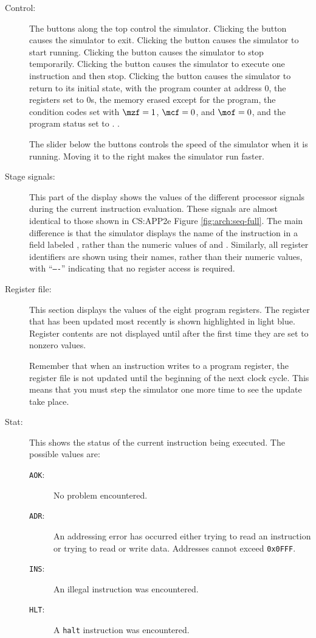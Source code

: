 \documentclass[11pt]{article}
\begin{document}
\begin{description}
\item[Control:] The buttons along the top control the simulator.
Clicking the  button causes the simulator to exit.
Clicking the  button causes the simulator to start running.
Clicking the  button causes the simulator to stop
temporarily.  Clicking the  button causes the simulator to
execute one instruction and then stop.  Clicking the 
button causes the simulator to return to its initial state, with the
program counter at address 0, the registers set to 0s, the memory
erased except for the program, the condition codes set with
$\mzf = 1$, $\mcf = 0$, and $\mof = 0$, and the program status set to .
\verb@AOK@.

The slider below the buttons controls the speed of the simulator when
it is running.  Moving it to the right makes the simulator run faster.

\item[Stage signals:] 
This part of the display shows the values of the
different processor signals during the current instruction evaluation.
These signals are almost identical to those shown in CS:APP2e Figure
\ref{fig:arch:seq-full}.  The main difference is that the simulator
displays the name of the instruction in a field labeled ,
rather than the numeric values of  and .
Similarly, all register identifiers are shown using their names,
rather  than their numeric values, with
``\texttt{----}'' indicating that no register access is required.
\item[Register file:] This section displays the values of the eight
program registers.  The register that has been updated most recently
is shown highlighted in light blue.  Register contents are not displayed
until after the first time they are set to nonzero values.

Remember that when an instruction writes to a program register, the
register file is not updated until the beginning of the next clock
cycle.  This means that you must step the simulator one more time to
see the update take place.

\item[Stat:] This shows the status of the current instruction being
executed.  The possible values are:
\begin{description}
\item[\texttt{AOK}:] No problem encountered.
\item[\texttt{ADR}:] An addressing error has occurred either trying to read an
instruction or trying to read or write data.  Addresses cannot exceed
\texttt{0x0FFF}.
\item[\texttt{INS}:] An illegal instruction was encountered.
\item[\texttt{HLT}:] A \texttt{halt} instruction was encountered.
\end{description}


\end{description}
\end{document}
